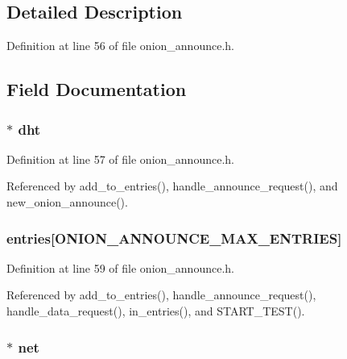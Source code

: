 \subsection{Detailed Description}


Definition at line 56 of file onion\+\_\+announce.\+h.



\subsection{Field Documentation}
\hypertarget{struct_onion___announce_a8b3d6ce8745acc52695e252bdb1531b6}{
\subsubsection[{dht}]{$\ast$ dht}}\label{struct_onion___announce_a8b3d6ce8745acc52695e252bdb1531b6}


Definition at line 57 of file onion\+\_\+announce.\+h.



Referenced by add\+\_\+to\+\_\+entries(), handle\+\_\+announce\+\_\+request(), and new\+\_\+onion\+\_\+announce().

\hypertarget{struct_onion___announce_a2de468d0c9db89713f12f2e7bd984023}{
\subsubsection[{entries}]{ entries\mbox{[}{\bf O\+N\+I\+O\+N\+\_\+\+A\+N\+N\+O\+U\+N\+C\+E\+\_\+\+M\+A\+X\+\_\+\+E\+N\+T\+R\+I\+E\+S}\mbox{]}}}\label{struct_onion___announce_a2de468d0c9db89713f12f2e7bd984023}


Definition at line 59 of file onion\+\_\+announce.\+h.



Referenced by add\+\_\+to\+\_\+entries(), handle\+\_\+announce\+\_\+request(), handle\+\_\+data\+\_\+request(), in\+\_\+entries(), and S\+T\+A\+R\+T\+\_\+\+T\+E\+S\+T().

\hypertarget{struct_onion___announce_aa14ea2f67950f57fe4235d7375a2216c}{
\subsubsection[{net}]{$\ast$ net}}\label{struct_onion___announce_aa14ea2f67950f57fe4235d7375a2216c}


